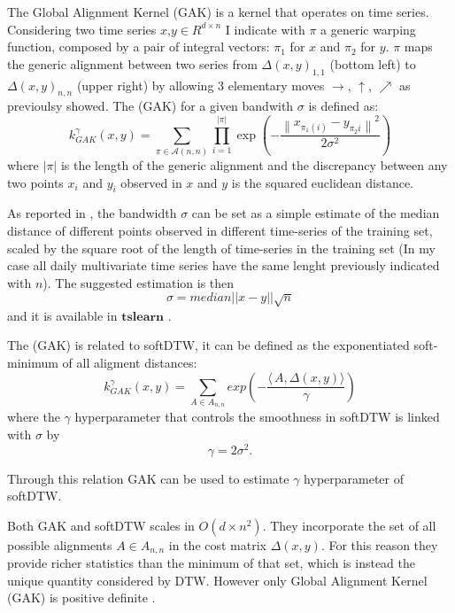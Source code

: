 \documentclass[11pt]{article}
\begin{document}
The Global Alignment Kernel (GAK) is a kernel that operates on time
series. Considering two time series \(x\),\(y \in R^{d \times n }\) I
indicate with \(\pi\) a generic warping function, composed by a pair of
integral vectors: \(\pi_1\) for \(x\) and \(\pi_2\) for \(y\). \(\pi\)
maps the generic alignment between two series from \(\Delta(x,y)_{1,1}\)
(bottom left) to \(\Delta(x,y) _{n,n}\) (upper right) by allowing 3
elementary moves \(\rightarrow\), \(\uparrow\), \(\nearrow\) as
previoulsy showed. The (GAK) for a given bandwith \(\sigma\) is defined
as: \begin{equation}
\label{eq:6}
k_{GAK}^{\gamma}(x,y) = \sum_{\pi \in \mathcal{A}(n,n)}\prod_{i=1}^{ | \pi | }
            \exp \left( - \frac{ \left\| x_{\pi_1(i)} - y_{\pi_2{i}} \right\|^2}{2 \sigma^2} \right)
\end{equation} where \(| \pi |\) is the length of the generic alignment
and the discrepancy between any two points \(x_i\) and \(y_i\) observed
in \(x\) and \(y\) is the squared euclidean distance.

As reported in \cite{cuturi2011fast}, the bandwidth \(\sigma\) can be
set as a simple estimate of the median distance of different points
observed in different time-series of the training set, scaled by the
square root of the length of time-series in the training set (In my case
all daily multivariate time series have the same lenght previously
indicated with \(n\)). The suggested estimation is then \begin{equation}
\label{eq:7}
\sigma = median||x - y||\sqrt{n}
\end{equation} and it is available in \(\textbf{tslearn}\)
\cite{tavenard2020tslearn} .

The (GAK) is related to softDTW, it can be defined as the exponentiated
soft-minimum of all aligment distances: \begin{equation}
\label{eq:8}
k_{GAK}^{\gamma}(x,y)=\sum_{A \in A_{n,n}} exp(- \frac{\langle\,A,\Delta(x,y) \rangle}{\gamma}) 
\end{equation} where the \(\gamma\) hyperparameter that controls the
smoothness in softDTW is linked with \(\sigma\) by \begin{equation}
\label{eq:9}
\gamma = 2 \sigma^2.
\end{equation}

Through this relation GAK can be used to estimate \(\gamma\)
hyperparameter of softDTW.

Both GAK and softDTW scales in \(O(d \times n^2)\). They incorporate the
set of all possible alignments \(A \in A_{n,n}\) in the cost matrix
\(\Delta(x,y)\). For this reason they provide richer statistics than the
minimum of that set, which is instead the unique quantity considered by
DTW. However only Global Alignment Kernel (GAK) is positive definite
\cite{blondel2021differentiable}.
\end{document}

